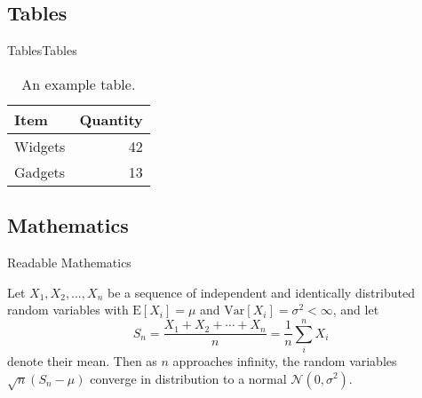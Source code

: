 \documentclass[10pt]{beamer} %
\begin{document}
\subsection{Tables}

\begin{frame}{Tables}{Tables}

\begin{table}
\centering
\begin{tabular}{l|r}
Item & Quantity \\\hline
Widgets & 42 \\
Gadgets & 13
\end{tabular}
\caption{\label{tab:widgets}An example table.}
\end{table}

\end{frame}

\subsection{Mathematics}

\begin{frame}{Readable Mathematics}

Let $X_1, X_2, \ldots, X_n$ be a sequence of independent and identically distributed random variables with $\text{E}[X_i] = \mu$ and $\text{Var}[X_i] = \sigma^2 < \infty$, and let
$$S_n = \frac{X_1 + X_2 + \cdots + X_n}{n}
      = \frac{1}{n}\sum_{i}^{n} X_i$$
denote their mean. Then as $n$ approaches infinity, the random variables $\sqrt{n}(S_n - \mu)$ converge in distribution to a normal $\mathcal{N}(0, \sigma^2)$.

\end{frame}
\end{document}
